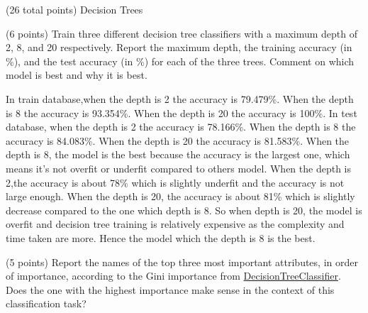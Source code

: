 \documentclass[12pt]{article}
\begin{document}
\begin{question}{(26 total points) Decision Trees}
\begin{subquestion}
\end{subquestion}


%
%
\begin{subquestion}{(6 points) 
Train three different decision tree classifiers with a maximum depth of 2, 8, and 20 respectively.
Report the maximum depth, the training accuracy (in \%), and the test accuracy (in \%) for each of the three trees.
Comment on which model is best and why it is best. \\
}


\begin{answerbox}{20em}
In train database,when the depth is 2 the accuracy is 79.479\%. When the depth is 8 the accuracy is 93.354\%. When the depth is 20 the accuracy is 100\%.
In test database, when the depth is 2 the accuracy is 78.166\%. When the depth is 8 the accuracy is 84.083\%. When the depth is 20 the accuracy is 81.583\%.
When the depth is 8, the model is the best because the accuracy is the largest one, which means it's not overfit or underfit compared to others model. When the depth is 2,the accuracy is about 78\% which is slightly underfit and the accuracy is not large enough. When the depth is 20, the accuracy is about 81\% which is slightly decrease compared to the one which depth is 8. So when depth is 20, the model is overfit and decision tree training is relatively expensive as the complexity and time taken are more.
Hence the model which the depth is 8 is the best.
\end{answerbox}



\end{subquestion}


%
%
\begin{subquestion}{(5 points) 
Report the names of the top three most important attributes, in order of importance, according to the Gini importance from \href{https://scikit-learn.org/0.19/modules/generated/sklearn.tree.DecisionTreeClassifier.html}{DecisionTreeClassifier}. 
Does the one with the highest importance make sense in the context of this classification task? \\
}



\end{subquestion}
\end{question}
\end{document}
